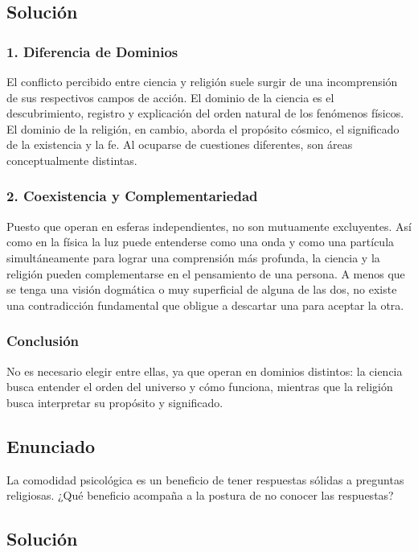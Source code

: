 \documentclass[12pt, a4paper]{article}
\begin{document}
\subsection*{Solución}

\subsubsection*{1. Diferencia de Dominios}
El conflicto percibido entre ciencia y religión suele surgir de una incomprensión de sus respectivos campos de acción. El dominio de la ciencia es el descubrimiento, registro y explicación del orden natural de los fenómenos físicos. El dominio de la religión, en cambio, aborda el propósito cósmico, el significado de la existencia y la fe. Al ocuparse de cuestiones diferentes, son áreas conceptualmente distintas.

\subsubsection*{2. Coexistencia y Complementariedad}
Puesto que operan en esferas independientes, no son mutuamente excluyentes. Así como en la física la luz puede entenderse como una onda y como una partícula simultáneamente para lograr una comprensión más profunda, la ciencia y la religión pueden complementarse en el pensamiento de una persona. A menos que se tenga una visión dogmática o muy superficial de alguna de las dos, no existe una contradicción fundamental que obligue a descartar una para aceptar la otra.

\subsubsection*{Conclusión}
No es necesario elegir entre ellas, ya que operan en dominios distintos: la ciencia busca entender el orden del universo y cómo funciona, mientras que la religión busca interpretar su propósito y significado.

\newpage

\subsection*{Enunciado}
La comodidad psicológica es un beneficio de tener respuestas sólidas a preguntas religiosas. ¿Qué beneficio acompaña a la postura de no conocer las respuestas?

\subsection*{Solución}
\end{document}
